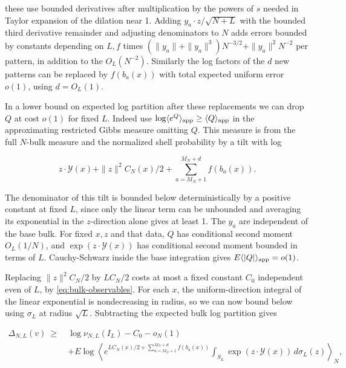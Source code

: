 \documentclass[11pt]{article}
\begin{document}
these use bounded derivatives after multiplication by the powers of $s$ needed in Taylor expansion of the dilation near 1. Adding $y_a\cdot z/\sqrt{N+L}$ with the bounded third derivative remainder and adjusting denominators to $N$ adds errors bounded by constants depending on $L,f$ times $(\|y_a\|+\|y_a\|^3)N^{-3/2}+\|y_a\|^2 N^{-2}$ per pattern, in addition to the $O_L(N^{-2})$. Similarly the log factors of the $d$ new patterns can be replaced by $f(b_a(x))$ with total expected uniform error $o(1)$, using $d=O_L(1)$.

In a lower bound on expected log partition after these replacements we can drop $Q$ at cost $o(1)$ for fixed $L$. Indeed use $\log \langle e^Q\rangle_{\rm app}\ge\langle Q\rangle_{\rm app}$ in the approximating restricted Gibbs measure omitting $Q$. This measure is from the full $N$-bulk measure and the normalized shell probability by a tilt with log

\begin{equation*}
z\cdot\mathcal Y(x)+\|z\|^2 C_N(x)/2+\sum_{a=M_N+1}^{M_N+d} f(b_a(x)).
\end{equation*}

The denominator of this tilt is bounded below deterministically by a positive constant at fixed $L$, since only the linear term can be unbounded and averaging its exponential in the $z$-direction alone gives at least 1. The $y_a$ are independent of the base bulk. For fixed $x,z$ and that data, $Q$ has conditional second moment $O_L(1/N)$, and $\exp(z\cdot\mathcal Y(x))$ has conditional second moment bounded in terms of $L$. Cauchy-Schwarz inside the base integration gives $E\langle |Q|\rangle_{\rm app}=o(1)$.

Replacing $\|z\|^2 C_N/2$ by $L C_N/2$ costs at most a fixed constant $C_0$ independent even of $L$, by \eqref{eq:bulk-observables}. For each $x$, the uniform-direction integral of the linear exponential is nondecreasing in radius, so we can now bound below using $\sigma_L$ at radius $\sqrt L$. Subtracting the expected bulk log partition gives

\begin{equation}\label{eq:cavity-increment}
\begin{aligned}
 \Delta_{N,L}(v)\ \ge\ &\log \nu_{N,L}(I_L)-C_0-o_N(1)\\
 &+ E\log\left\langle
 e^{L C_N(x)/2+\sum_{a=M_N+1}^{M_N+d} f(b_a(x))}
     \int_{S_L}\exp(z\cdot\mathcal Y(x))\,d\sigma_L(z)
                 \right\rangle_N,
 \end{aligned}
\end{equation}
\end{document}
